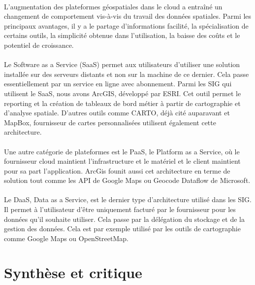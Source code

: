 \paragraph{}L'augmentation des plateformes géospatiales dans le cloud a entraîné un changement de comportement vis-à-vis du travail des données spatiales. Parmi les principaux avantages, il y a le partage d'informations facilité, la spécialisation de certains outils, la simplicité obtenue dans l'utilisation, la baisse des coûts et le potentiel de croissance.

\paragraph{}Le Software as a Service (SaaS) permet aux utilisateurs d'utiliser une solution installée sur des serveurs distants et non sur la machine de ce dernier. Cela passe essentiellement par un service en ligne avec abonnement. Parmi les SIG qui utilisent le SaaS, nous avons ArcGIS, développé par ESRI. Cet outil permet le reporting et la création de tableaux de bord métier à partir de cartographie et d'analyse spatiale. D'autres outils comme CARTO, déjà cité auparavant et MapBox, fournisseur de cartes personnalisées utilisent également cette architecture.

\paragraph{}Une autre catégorie de plateformes est le PaaS, le Platform as a Service, où le fournisseur cloud maintient l'infrastructure et le matériel et le client maintient pour sa part l'application. ArcGis founit aussi cet architecture en terme de solution tout comme les API de Google Maps ou Geocode Dataflow de Microsoft.

\paragraph{}Le DaaS, Data as a Service, est le dernier type d'architecture utilisé dans les SIG. Il permet à l'utilisateur d'être uniquement facturé par le fournisseur pour les données qu'il souhaite utiliser. Cela passe par la délégation du stockage et de la gestion des données. Cela est par exemple utilisé par les outils de cartographie comme Google Maps ou OpenStreetMap.


\section{Synthèse et critique}

